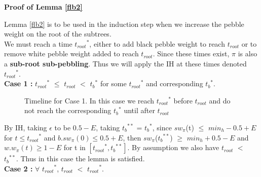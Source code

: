 \documentclass[12pt]{article}
\newenvironment{proofL}{\hspace{.4em}}
                      {\hspace{\fill}{$\blacksquare$} \smallskip}
\newcommand{\troot}{t_{root}}
\newcommand{\troots}{{t_{root}}^*}
\newcommand{\tbss}{{t_b}^{**}}
\newcommand{\tbs}{{t_b}^{*}}
\begin{document}
\noindent
 {\bf Proof of Lemma \ref{flb2}}\begin{proofL} 
 
Lemma \ref{flb2} is to be used in the induction step when we increase the pebble weight on the root of the subtrees.\\

We must reach a time $\troots$, either to add black pebble weight to reach $\troot$ or to remove white pebble weight added to reach $\troot$. Since these times exist, $\pi$ is also a {\bf sub-root sub-pebbling}. Thus we will apply the IH at these times denoted $\troots$.\\

\noindent
{\bf Case 1 :} $\troots$ $\leq$ $\troot$ $<$ $\tbs$ for some $\troots$ and corresponding $\tbs$.

\begin{figure}[H]
  \centering


\caption{Timeline for Case 1. In this case we reach $\troots$ before $\troot$ and do not reach the corresponding $\tbs$ until after $\troot$}
\end{figure}


By IH, taking $\epsilon$ to be $0.5-E$, taking $\tbss$ = $\tbs$, since $sw_{\pi}$(t) $\leq$ $min_h -0.5 + E$ for $t \leq \troots$ and $b.sw_{\pi}(0) \leq 0.5 + E$, then $sw_{\pi}$($\tbss$) $\geq$ $min_h + 0.5-E$ and $w.w_\pi(t) \geq 1-E$ for t in $[\troots, \tbss]$. By assumption we also have $\troot$ $<$ $\tbss$. Thus in this case the lemma is satisfied.\\

\noindent
{\bf Case 2 :} $\forall$ $\troots$, $\troot$ $<$ $\troots$.

\begin{figure}[H]
  \centering
\begin{tikzpicture}


\end{tikzpicture}
\end{figure}
\end{proofL}
\end{document}
